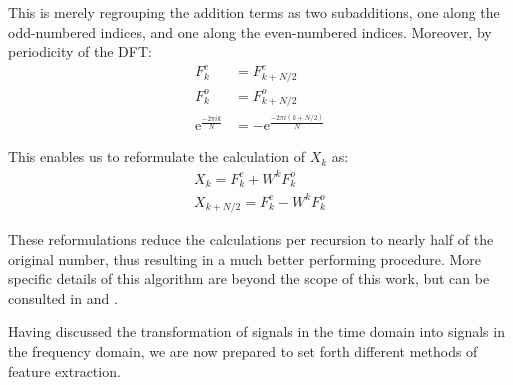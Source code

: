 \documentclass[../main.tex]{subfiles}
\begin{document}
\par This is merely regrouping the addition terms as two subadditions, one along the odd-numbered indices, and one along the even-numbered indices. Moreover, by periodicity of the DFT:
\begin{align*}
F^e_k &= F^e_{k+N/2}\\
F^o_k &= F^o_{k+N/2}\\
\mathrm{e}^ {\frac{-2\pi ik}{N} } &= -\mathrm{e}^ {\frac{-2\pi i(k+N/2)}{N} }
\end{align*}
\par This enables us to reformulate the calculation of $X_k$ as:
\begin{align*}
X_k = F^e_k + W^kF^o_k\\
X_{k+N/2} = F^e_k - W^kF^o_k
\end{align*}
\par These reformulations reduce the calculations per recursion to nearly half of the original number, thus resulting in a much better performing procedure. More specific details of this algorithm are beyond the scope of this work, but can be consulted in \cite{Smith2011} and \cite{Cooley1965}.
\par Having discussed the transformation of signals in the time domain into signals in the frequency domain, we are now prepared to set forth different methods of feature extraction.
\end{document}
